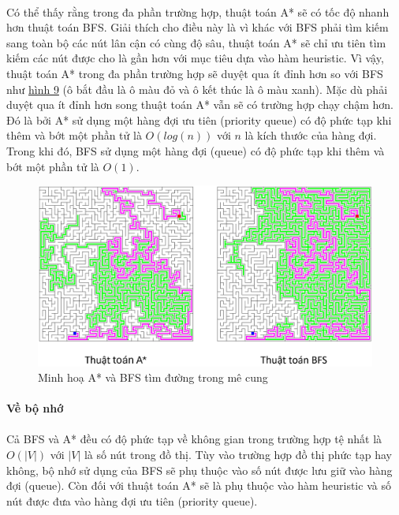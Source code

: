 \paragraph{}{Có thể thấy rằng trong đa phần trường hợp, thuật toán A* sẽ có tốc độ nhanh hơn thuật toán BFS. Giải thích cho điều này là vì khác với BFS phải tìm kiếm sang toàn bộ các nút lân cận có cùng độ sâu, thuật toán A* sẽ chỉ ưu tiên tìm kiếm các nút được cho là gần hơn với mục tiêu dựa vào hàm heuristic. Vì vậy, thuật toán A* trong đa phần trường hợp sẽ duyệt qua ít đỉnh hơn so với BFS như \hyperref[fig:compare2_astar_bfs]{hình 9} (ô bắt đầu là ô màu đỏ và ô kết thúc là ô màu xanh). Mặc dù phải duyệt qua ít đỉnh hơn song thuật toán A* vẫn sẽ có trường hợp chạy chậm hơn. Đó là bởi A* sử dụng một hàng đợi ưu tiên (priority queue) có độ phức tạp khi thêm và bớt một phần tử là $O(log(n))$ với $n$ là kích thước của hàng đợi. Trong khi đó, BFS sử dụng một hàng đợi (queue) có độ phức tạp khi thêm và bớt một phần tử là $O(1)$.}

\begin{figure}[H]
    \centering
    \includegraphics[width=1\linewidth]{img/compare2_astar_bfs.png}
    \caption{Minh hoạ A* và BFS tìm đường trong mê cung}
    \label{fig:compare2_astar_bfs}
\end{figure}

\paragraph{Về bộ nhớ}
\paragraph{}{Cả BFS và A* đều có độ phức tạp về không gian trong trường hợp tệ nhất là $O(|V|)$ với $|V|$ là số nút trong đồ thị. Tùy vào trường hợp đồ thị phức tạp hay không, bộ nhớ sử dụng của BFS sẽ phụ thuộc vào số nút được lưu giữ vào hàng đợi (queue). Còn đối với thuật toán A* sẽ là phụ thuộc vào hàm heuristic và số nút được đưa vào hàng đợi ưu tiên (priority queue).}


